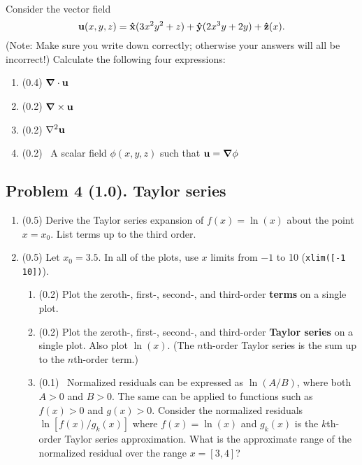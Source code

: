 \documentclass[11pt,titlepage,fleqn]{article}
\begin{document}
\citep[][p.~473, Problem~13]{SteinWysession} \\
Consider the vector field
%
\begin{equation}
\mbox{${\bf u}$}(x,y,z) = \mbox{\boldmath{$\hat{\rm x}$}}(3x^2y^2 + z) + \mbox{\boldmath{$\hat{\rm y}$}}(2x^3y+2y) + \mbox{\boldmath{$\hat{\rm z}$}}(x).
\label{vec}
\end{equation}
%
(Note: Make sure you write down  correctly; otherwise your answers will all be incorrect!) Calculate the following four expressions:
%
\begin{enumerate}
\item (0.4) $\mbox{\boldmath $\nabla$} \cdot \mbox{${\bf u}$}$
\item (0.2) $\mbox{\boldmath $\nabla$} \times \mbox{${\bf u}$}$
\item (0.2) $\nabla^2\mbox{${\bf u}$}$
\item (0.2) \ptag\ A scalar field $\phi(x,y,z)$ such that $\mbox{${\bf u}$}=\mbox{\boldmath $\nabla$}\phi$
\end{enumerate}


\subsection*{Problem 4 (1.0). Taylor series}

\begin{enumerate}
\item (0.5) Derive the Taylor series expansion of $f(x) = \ln(x)$ about the point $x = x_0$. List terms up to the third order.

\item (0.5) Let $x_0 = 3.5$. In all of the plots, use $x$ limits from $-1$ to 10 (\verb+xlim([-1 10])+).
%
\begin{enumerate}
\item (0.2) Plot the zeroth-, first-, second-, and third-order {\bf terms} on a single plot.

\item (0.2) Plot the zeroth-, first-, second-, and third-order {\bf Taylor series} on a single plot. Also plot $\ln(x)$.
(The $n$th-order Taylor series is the sum up to the $n$th-order term.) 

\item (0.1) \ptag\ Normalized residuals can be expressed as $\ln(A/B)$, where both $A > 0$ and $B > 0$.
The same can be applied to functions such as $f(x) > 0$ and $g(x) > 0$.
Consider the normalized residuals $\ln[ f(x) / g_k(x) ]$ where $f(x) = \ln(x)$ and $g_k(x)$ is the $k$th-order Taylor series approximation. What is the approximate range of the normalized residual over the range $x = [3,4]$?
\end{enumerate}

\end{enumerate}
\end{document}
